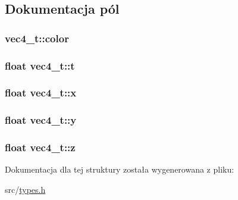 \subsection{Dokumentacja pól}
\hypertarget{structvec4__t_a88cf183e80fa104a47beaa05e8b9304a}{
\subsubsection[{color}]{ vec4\-\_\-t\-::color}}\label{structvec4__t_a88cf183e80fa104a47beaa05e8b9304a}
\hypertarget{structvec4__t_a319293b88b7d43842af7a8286e9956d2}{
\subsubsection[{t}]{\setlength{\rightskip}{0pt plus 5cm}float vec4\-\_\-t\-::t}}\label{structvec4__t_a319293b88b7d43842af7a8286e9956d2}
\hypertarget{structvec4__t_ad2fbafa2239dc9fd20a91524dbf0b85e}{
\subsubsection[{x}]{\setlength{\rightskip}{0pt plus 5cm}float vec4\-\_\-t\-::x}}\label{structvec4__t_ad2fbafa2239dc9fd20a91524dbf0b85e}
\hypertarget{structvec4__t_ae02fff68097997cbe7ef9baf8ae22c4e}{
\subsubsection[{y}]{\setlength{\rightskip}{0pt plus 5cm}float vec4\-\_\-t\-::y}}\label{structvec4__t_ae02fff68097997cbe7ef9baf8ae22c4e}
\hypertarget{structvec4__t_a8b304789747fe4a22eb84d464ee1dd5f}{
\subsubsection[{z}]{\setlength{\rightskip}{0pt plus 5cm}float vec4\-\_\-t\-::z}}\label{structvec4__t_a8b304789747fe4a22eb84d464ee1dd5f}


Dokumentacja dla tej struktury została wygenerowana z pliku\-:\begin{DoxyCompactItemize}
\item 
src/\hyperlink{types_8h}{types.\-h}\end{DoxyCompactItemize}

